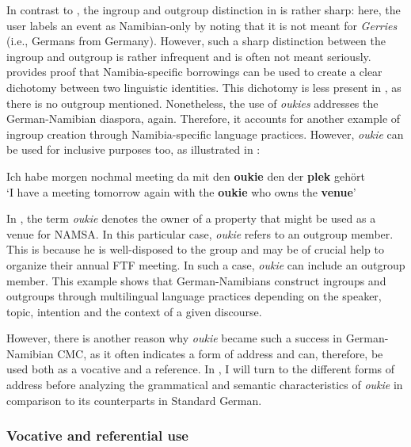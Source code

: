 \documentclass[output=paper]{langsci/langscibook}
\begin{document}
In contrast to , the ingroup and outgroup distinction in  is rather sharp: here, the user labels an event as Namibian-only by noting that it is not meant for \textit{Gerries} (i.e., Germans from Germany). However, such a sharp distinction between the ingroup and outgroup is rather infrequent and is often not meant seriously.  provides proof that Namibia-specific borrowings can be used to create a clear dichotomy between two linguistic identities. This dichotomy is less present in , as there is no outgroup mentioned. Nonetheless, the use of \textit{oukies} addresses the German-Namibian diaspora, again. Therefore, it accounts for another example of ingroup creation through Namibia-specific language practices. However, \textit{oukie} can be used for inclusive purposes too, as illustrated in :

\ea\label{ex:radke:14}
 Ich habe morgen nochmal meeting da mit den \textbf{oukie} den der \textbf{plek} gehört\smallskip\\\relax
‘I have a meeting tomorrow again with the \textbf{oukie} who owns the \textbf{venue}’\\
\z

In , the term \textit{oukie} denotes the owner of a property that might be used as a venue for NAMSA. In this particular case, \textit{oukie} refers to an outgroup member. This is because he is well-disposed to the group and may be of crucial help to organize their annual FTF meeting. In such a case, \textit{oukie} can include an outgroup member. This example shows that German-Namibians construct ingroups and outgroups through multilingual language practices depending on the speaker, topic, intention and the context of a given discourse. 

However, there is another reason why \textit{oukie} became such a success in German-Namibian CMC, as it often indicates a form of address and can, therefore, be used both as a vocative and a reference. In , I will turn to the different forms of address before analyzing the grammatical and semantic characteristics of \textit{oukie} in comparison to its counterparts in Standard German.

 
\subsubsection{Vocative and referential use} 
 \label{sec:radke:3.4.3}
\end{document}
